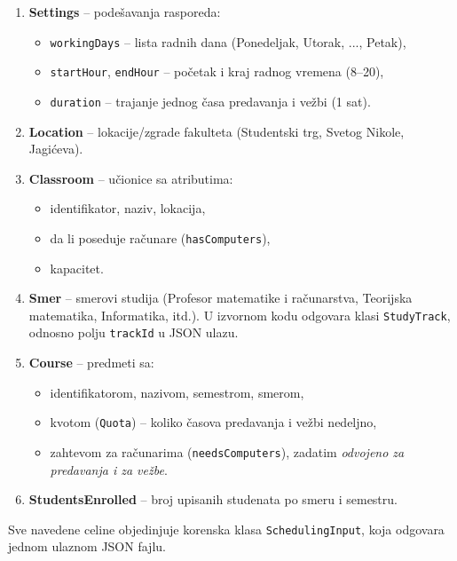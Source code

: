 \documentclass[12pt,oneside]{memoir}
\begin{document}
\begin{enumerate}
\item \textbf{Settings} -- podešavanja rasporeda:
  \begin{itemize}
  \item \texttt{workingDays} -- lista radnih dana
    (Ponedeljak, Utorak, ..., Petak),
  \item \texttt{startHour}, \texttt{endHour} -- početak i kraj
    radnog vremena (8--20),
  \item \texttt{duration} -- trajanje jednog časa predavanja i vežbi (1 sat).
  \end{itemize}

\item \textbf{Location} -- lokacije/zgrade fakulteta (Studentski trg,
  Svetog Nikole, Jagićeva).

\item \textbf{Classroom} -- učionice sa atributima:
  \begin{itemize}
  \item identifikator, naziv, lokacija,
  \item da li poseduje računare (\texttt{hasComputers}),
  \item kapacitet.
  \end{itemize}

\item \textbf{Smer} -- smerovi studija (Profesor matematike i
  računarstva, Teorijska matematika, Informatika, itd.). U izvornom
  kodu odgovara klasi \texttt{StudyTrack}, odnosno polju
  \texttt{trackId} u JSON ulazu.

\item \textbf{Course} -- predmeti sa:
  \begin{itemize}
  \item identifikatorom, nazivom, semestrom, smerom,
  \item kvotom (\texttt{Quota}) -- koliko časova predavanja i vežbi
    nedeljno,
  \item zahtevom za računarima (\texttt{needsComputers}), zadatim
    \emph{odvojeno za predavanja i za vežbe}.
  \end{itemize}

\item \textbf{StudentsEnrolled} -- broj upisanih studenata po smeru
  i semestru.
\end{enumerate}

Sve navedene celine objedinjuje korenska klasa
\texttt{SchedulingInput}, koja odgovara jednom ulaznom JSON fajlu.
\end{document}
